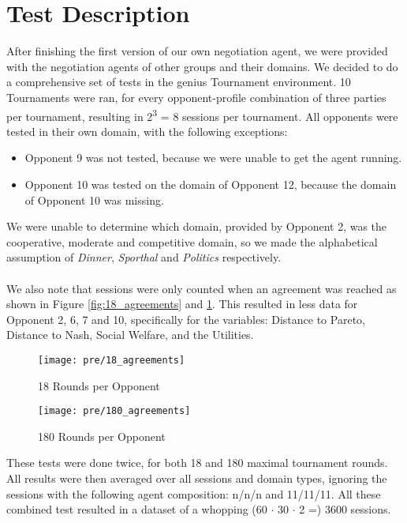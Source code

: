 \section{Test Description}

After finishing the first version of our own negotiation agent, we were provided with the negotiation agents of other groups and their domains. We decided to do a comprehensive set of tests in the genius Tournament environment. 10 Tournaments were ran, for every opponent-profile combination of three parties per tournament, resulting in 2\textsuperscript{3} = 8 sessions per tournament. All opponents were tested in their own domain, with the following exceptions:

\begin{itemize}
	\item Opponent 9 was not tested, because we were unable to get the agent running. 
	\item Opponent 10 was tested on the domain of Opponent 12, because the domain of Opponent 10 was missing.
\end{itemize}

\noindent
We were unable to determine which domain, provided by Opponent 2, was the cooperative, moderate and competitive domain, so we made the alphabetical assumption of \textit{Dinner}, \textit{Sporthal} and \textit{Politics} respectively.
\\\\
We also note that sessions were only counted when an agreement was reached as shown in Figure \ref{fig:18_agreements} and \ref{fig:180_agreements}. This resulted in less data for Opponent 2, 6, 7 and 10, specifically for the variables: Distance to Pareto, Distance to Nash, Social Welfare, and the Utilities.

\begin{figure}[!htb]
	\texttt{[image: pre/18\_agreements]}
	\caption{18 Rounds per Opponent}
	\label{fig:18_agreements}
	\endminipage\hfill
	\texttt{[image: pre/180\_agreements]}
	\caption{180 Rounds per Opponent}
	\label{fig:180_agreements}
	\endminipage\hfill
\end{figure}

\noindent
These tests were done twice, for both 18 and 180 maximal tournament rounds.
All results were then averaged over all sessions and domain types, ignoring the sessions with the following agent composition: n/n/n and 11/11/11. All these combined test resulted in a dataset of a whopping (60 $\cdot$ 30 $\cdot$ 2 =) 3600 sessions.